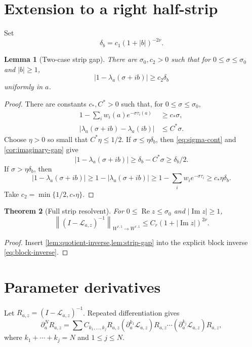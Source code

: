 \documentclass[11pt,reqno]{amsart}
\newtheorem{theorem}{Theorem}[section]
\newtheorem{lemma}[theorem]{Lemma}
\theoremstyle{definition}
\theoremstyle{remark}
\newcommand{\norm}[1]{\left\lVert#1\right\rVert}
\newcommand{\abs}[1]{\left\lvert#1\right\rvert}
\begin{document}
\section{Extension to a right half-strip}

Set
\[
 \delta_b=c_1(1+\abs b)^{-2\nu}.
\]

\begin{lemma}[Two-case strip gap]\label{lem:strip-gap}
There are $\sigma_0,c_2>0$ such that for
$0\le\sigma\le\sigma_0$ and $\abs b\ge1$,
\begin{equation}\label{eq:strip-gap}
 \abs{1-\lambda_a(\sigma+ib)}\ge c_2\delta_b
\end{equation}
uniformly in $a$.
\end{lemma}

\begin{proof}
There are constants $c_*,C^*>0$ such that, for
$0\le\sigma\le\sigma_0$,
\begin{align}
 1-\sum_iw_i(a)e^{-\sigma\tau_i(a)}&\ge c_*\sigma,
 \label{eq:radial-loss}\\
 \abs{\lambda_a(\sigma+ib)-\lambda_a(ib)}&\le C^*\sigma.
 \label{eq:sigma-cont}
\end{align}
Choose $\eta>0$ so small that $C^*\eta\le1/2$.  If
$\sigma\le\eta\delta_b$, then \eqref{eq:sigma-cont} and
\cref{cor:imaginary-gap} give
\[
 \abs{1-\lambda_a(\sigma+ib)}
 \ge\delta_b-C^*\sigma\ge\delta_b/2.
\]
If $\sigma>\eta\delta_b$, then
\[
 \abs{1-\lambda_a(\sigma+ib)}
 \ge1-\abs{\lambda_a(\sigma+ib)}
 \ge1-\sum_iw_ie^{-\sigma\tau_i}
 \ge c_*\eta\delta_b.
\]
Take $c_2=\min\{1/2,c_*\eta\}$.
\end{proof}

\begin{theorem}[Full strip resolvent]\label{thm:strip-resolvent}
For $0\le\operatorname{Re}z\le\sigma_0$ and
$\abs{\operatorname{Im}z}\ge1$,
\[
 \norm{(I-\mathcal L_{a,z})^{-1}}_{W^{r,1}\to W^{r,1}}
 \le C_r(1+\abs{\operatorname{Im}z})^{2\nu}.
\]
\end{theorem}

\begin{proof}
Insert \cref{lem:quotient-inverse,lem:strip-gap} into the explicit block
inverse \eqref{eq:block-inverse}.
\end{proof}

\section{Parameter derivatives}

Let $R_{a,z}=(I-\mathcal L_{a,z})^{-1}$.  Repeated differentiation gives
\begin{equation}\label{eq:resolvent-word}
 \partial_a^NR_{a,z}
 =\sum C_{k_1,\ldots,k_j}
 R_{a,z}(\partial_a^{k_1}\mathcal L_{a,z})R_{a,z}
 \cdots
 (\partial_a^{k_j}\mathcal L_{a,z})R_{a,z},
\end{equation}
where $k_1+\cdots+k_j=N$ and $1\le j\le N$.
\end{document}
